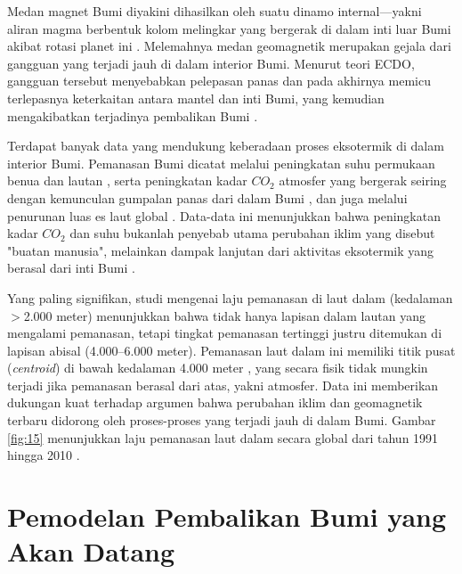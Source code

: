 \documentclass[10pt,twocolumn,letterpaper]{article}
\begin{document}
Medan magnet Bumi diyakini dihasilkan oleh suatu dinamo internal—yakni aliran magma berbentuk kolom melingkar yang bergerak di dalam inti luar Bumi akibat rotasi planet ini \cite{123}. Melemahnya medan geomagnetik merupakan gejala dari gangguan yang terjadi jauh di dalam interior Bumi. Menurut teori ECDO, gangguan tersebut menyebabkan pelepasan panas dan pada akhirnya memicu terlepasnya keterkaitan antara mantel dan inti Bumi, yang kemudian mengakibatkan terjadinya pembalikan Bumi \cite{1}.

Terdapat banyak data yang mendukung keberadaan proses eksotermik di dalam interior Bumi. Pemanasan Bumi dicatat melalui peningkatan suhu permukaan benua dan lautan \cite{127,128}, serta peningkatan kadar $CO_2$ atmosfer yang bergerak seiring dengan kemunculan gumpalan panas dari dalam Bumi \cite{129,130}, dan juga melalui penurunan luas es laut global \cite{131}. Data-data ini menunjukkan bahwa peningkatan kadar $CO_2$ dan suhu bukanlah penyebab utama perubahan iklim yang disebut "buatan manusia", melainkan dampak lanjutan dari aktivitas eksotermik yang berasal dari inti Bumi \cite{129}.

Yang paling signifikan, studi mengenai laju pemanasan di laut dalam (kedalaman $>$2.000 meter) menunjukkan bahwa tidak hanya lapisan dalam lautan yang mengalami pemanasan, tetapi tingkat pemanasan tertinggi justru ditemukan di lapisan abisal (4.000–6.000 meter). Pemanasan laut dalam ini memiliki titik pusat (\textit{centroid}) di bawah kedalaman 4.000 meter \cite{132,129}, yang secara fisik tidak mungkin terjadi jika pemanasan berasal dari atas, yakni atmosfer. Data ini memberikan dukungan kuat terhadap argumen bahwa perubahan iklim dan geomagnetik terbaru didorong oleh proses-proses yang terjadi jauh di dalam Bumi. Gambar \ref{fig:15} menunjukkan laju pemanasan laut dalam secara global dari tahun 1991 hingga 2010 \cite{132}.

\section{Pemodelan Pembalikan Bumi yang Akan Datang}
\end{document}
